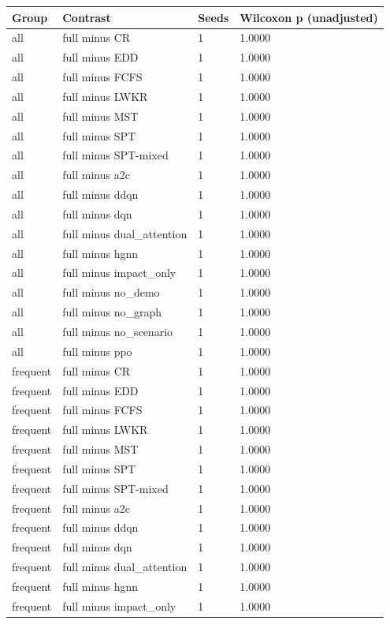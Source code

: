 \begin{tabular}{llll}
\toprule
Group & Contrast & Seeds & Wilcoxon p (unadjusted)\\
\midrule
all & full minus CR & 1 & 1.0000\\
all & full minus EDD & 1 & 1.0000\\
all & full minus FCFS & 1 & 1.0000\\
all & full minus LWKR & 1 & 1.0000\\
all & full minus MST & 1 & 1.0000\\
all & full minus SPT & 1 & 1.0000\\
all & full minus SPT-mixed & 1 & 1.0000\\
all & full minus a2c & 1 & 1.0000\\
all & full minus ddqn & 1 & 1.0000\\
all & full minus dqn & 1 & 1.0000\\
all & full minus dual\_attention & 1 & 1.0000\\
all & full minus hgnn & 1 & 1.0000\\
all & full minus impact\_only & 1 & 1.0000\\
all & full minus no\_demo & 1 & 1.0000\\
all & full minus no\_graph & 1 & 1.0000\\
all & full minus no\_scenario & 1 & 1.0000\\
all & full minus ppo & 1 & 1.0000\\
frequent & full minus CR & 1 & 1.0000\\
frequent & full minus EDD & 1 & 1.0000\\
frequent & full minus FCFS & 1 & 1.0000\\
frequent & full minus LWKR & 1 & 1.0000\\
frequent & full minus MST & 1 & 1.0000\\
frequent & full minus SPT & 1 & 1.0000\\
frequent & full minus SPT-mixed & 1 & 1.0000\\
frequent & full minus a2c & 1 & 1.0000\\
frequent & full minus ddqn & 1 & 1.0000\\
frequent & full minus dqn & 1 & 1.0000\\
frequent & full minus dual\_attention & 1 & 1.0000\\
frequent & full minus hgnn & 1 & 1.0000\\
frequent & full minus impact\_only & 1 & 1.0000\\

\end{tabular}
